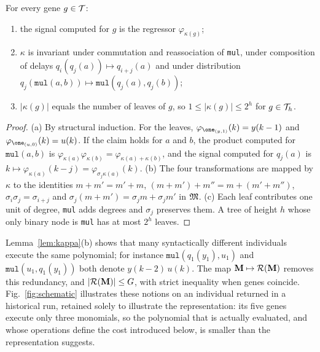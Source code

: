\begin{lemma}\label{lem:kappa}
For every gene $g\in\mathcal{T}$:
\begin{enumerate}
\item[(a)] the signal computed for $g$ is the regressor $\varphi_{\kappa(g)}$;
\item[(b)] $\kappa$ is invariant under commutation and reassociation of \texttt{mul}, under composition of delays
$q_i(q_j(a))\mapsto q_{i+j}(a)$ and under distribution $q_j(\texttt{mul}(a,b))\mapsto\texttt{mul}(q_j(a),q_j(b))$;
\item[(c)] $|\kappa(g)|$ equals the number of leaves of $g$, so $1\le|\kappa(g)|\le 2^{h}$ for $g\in\mathcal{T}_h$.
\end{enumerate}
\end{lemma}
\begin{proof}
(a) By structural induction. For the leaves, $\varphi_{\one_{(y,1)}}(k)=y(k-1)$ and
$\varphi_{\one_{(u,0)}}(k)=u(k)$. If the claim holds for $a$ and $b$, the product computed for $\texttt{mul}(a,b)$ is
$\varphi_{\kappa(a)}\varphi_{\kappa(b)}=\varphi_{\kappa(a)+\kappa(b)}$, and the signal computed for $q_j(a)$ is
$k\mapsto\varphi_{\kappa(a)}(k-j)=\varphi_{\sigma_j\kappa(a)}(k)$.
(b) The four transformations are mapped by $\kappa$ to the identities $m+m'=m'+m$, $(m+m')+m''=m+(m'+m'')$,
$\sigma_i\sigma_j=\sigma_{i+j}$ and $\sigma_j(m+m')=\sigma_jm+\sigma_jm'$ in $\mathfrak{M}$.
(c) Each leaf contributes one unit of degree, \texttt{mul} adds degrees and $\sigma_j$ preserves them. A tree of
height $h$ whose only binary node is \texttt{mul} has at most $2^h$ leaves.
\end{proof}

Lemma~\ref{lem:kappa}(b) shows that many syntactically different individuals execute the same polynomial; for
instance $\texttt{mul}(q_1(y_1),u_1)$ and $\texttt{mul}(u_1,q_1(y_1))$ both denote $y(k-2)\,u(k)$. The map
$\mathbf{M}\mapsto\mathcal{R}(\mathbf{M})$ removes this redundancy, and $|\mathcal{R}(\mathbf{M})|\le G$, with strict inequality when genes coincide.
Fig.~\ref{fig:schematic} illustrates these notions on an individual returned in a historical run, retained solely to illustrate the representation: its five genes execute only three monomials, so the polynomial that is actually evaluated,
and whose operations define the cost introduced below, is smaller than the representation suggests.

